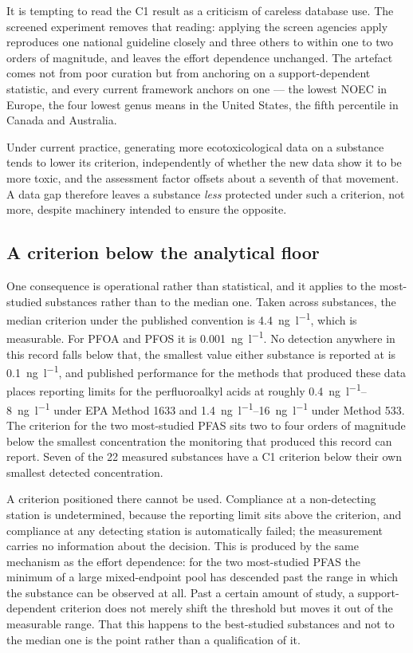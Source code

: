 \documentclass[preprint,12pt]{elsarticle}
\begin{document}
It is tempting to read the C1 result as a criticism of careless database use.
The screened experiment removes that reading: applying the screen agencies
apply reproduces one national guideline closely and three others to within one
to two orders of magnitude, and leaves the effort dependence unchanged. The
artefact comes not from poor curation but from anchoring on a
support-dependent statistic, and every current framework anchors on one --- the
lowest NOEC in Europe, the four lowest genus means in the United States, the
fifth percentile in Canada and Australia.

Under current practice, generating more ecotoxicological data on a substance
tends to lower its criterion, independently of whether the new data show it to
be more toxic, and the assessment factor offsets about a seventh of that
movement. A data gap therefore leaves a substance \emph{less} protected under
such a criterion, not more, despite machinery intended to ensure the opposite.

\subsection{A criterion below the analytical floor}

One consequence is operational rather than statistical, and it applies to the
most-studied substances rather than to the median one. Taken across substances,
the median criterion under the published convention is
\SI{4.4}{\nano\gram\per\litre}, which is measurable. For PFOA and PFOS it is
\SI{0.001}{\nano\gram\per\litre}. No detection anywhere in this record falls
below that, the smallest value either substance is reported at is
\SI{0.1}{\nano\gram\per\litre}, and published performance for the methods
that produced these data places reporting limits for the perfluoroalkyl acids
at roughly \SIrange{0.4}{8}{\nano\gram\per\litre} under EPA Method 1633 and
\SIrange{1.4}{16}{\nano\gram\per\litre} under Method 533. The criterion for
the two most-studied PFAS sits two to four orders of magnitude below the
smallest concentration the monitoring that produced this record can report.
Seven of the 22 measured substances have a C1 criterion below their own
smallest detected concentration.

A criterion positioned there cannot be used. Compliance at a non-detecting
station is undetermined, because the reporting limit sits above the criterion,
and compliance at any detecting station is automatically failed; the measurement
carries no information about the decision. This is produced by the same
mechanism as the effort dependence: for the two most-studied PFAS the minimum of
a large mixed-endpoint pool has descended past the range in which the substance
can be observed at all. Past a certain amount of study, a support-dependent
criterion does not merely shift the threshold but moves it out of the measurable
range. That this happens to the best-studied substances and not to the median
one is the point rather than a qualification of it.
\end{document}
